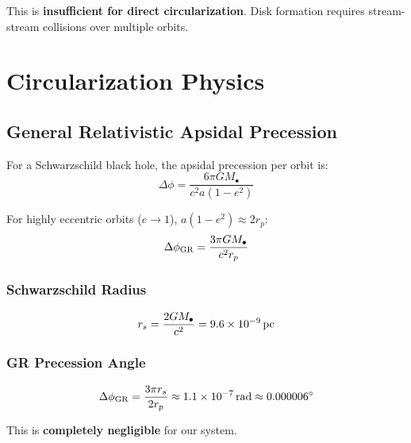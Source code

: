 \documentclass[twocolumn,amsmath,amssymb,prd,superscriptaddress,nofootinbib]{revtex4-2}
\begin{document}
This is \textbf{insufficient for direct circularization}. Disk formation requires stream-stream collisions over multiple orbits.

\section{Circularization Physics}
\label{sec:circularization}

\subsection{General Relativistic Apsidal Precession}
\label{sec:gr_precession}

For a Schwarzschild black hole, the apsidal precession per orbit is:
\begin{equation}
    \Delta\phi = \frac{6\pi GM_\bullet}{c^2 a(1-e^2)}
    \label{eq:GR_precession}
\end{equation}

For highly eccentric orbits ($e \to 1$), $a(1-e^2) \approx 2r_p$:
\begin{equation}
    \Delta\phi_{\rm GR} = \frac{3\pi GM_\bullet}{c^2 r_p}
    \label{eq:GR_precession_ecc}
\end{equation}

\subsubsection{Schwarzschild Radius}

\begin{equation}
    r_s = \frac{2GM_\bullet}{c^2} = 9.6 \times 10^{-9}\,{\rm pc}
\end{equation}

\subsubsection{GR Precession Angle}

\begin{equation}
    \Delta\phi_{\rm GR} = \frac{3\pi r_s}{2 r_p} \approx 1.1 \times 10^{-7}\,{\rm rad} \approx 0.000006^\circ
\end{equation}

This is \textbf{completely negligible} for our system.

\end{document}
